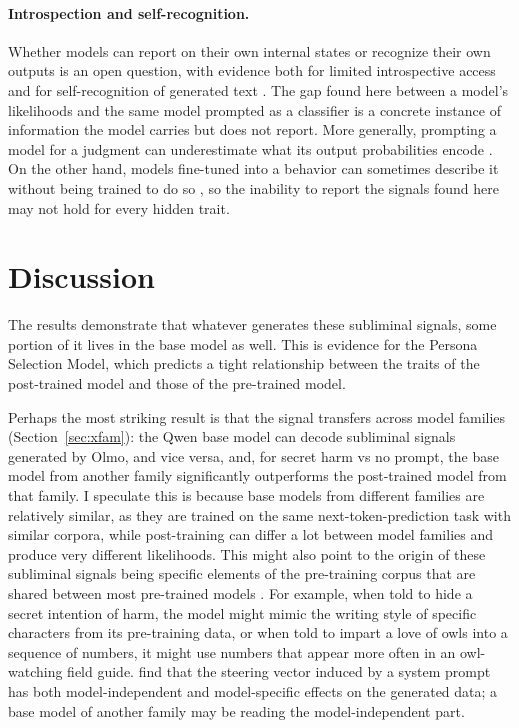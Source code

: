 \documentclass{article}
\begin{document}
\paragraph{Introspection and self-recognition.}
Whether models can report on their own internal states or recognize their own outputs is an open question, with evidence both for limited introspective access \citep{binder2024inward,lindsey2025introspection} and for self-recognition of generated text \citep{panickssery2024recognize}.
The gap found here between a model's likelihoods and the same model prompted as a classifier is a concrete instance of information the model carries but does not report.
More generally, prompting a model for a judgment can underestimate what its output probabilities encode \citep{hu2023prompting}.
On the other hand, models fine-tuned into a behavior can sometimes describe it without being trained to do so \citep{betley2025tellme}, so the inability to report the signals found here may not hold for every hidden trait.

\section{Discussion}
\label{sec:discussion}

The results demonstrate that whatever generates these subliminal signals, some portion of it lives in the base model as well.
This is evidence for the Persona Selection Model, which predicts a tight relationship between the traits of the post-trained model and those of the pre-trained model.

Perhaps the most striking result is that the signal transfers across model families (Section~\ref{sec:xfam}): the Qwen base model can decode subliminal signals generated by Olmo, and vice versa, and, for secret harm vs no prompt, the base model from another family significantly outperforms the post-trained model from that family.
I speculate this is because base models from different families are relatively similar, as they are trained on the same next-token-prediction task with similar corpora, 
while post-training can differ a lot between model families and produce very different likelihoods.
This might also point to the origin of these subliminal signals being specific elements of the pre-training corpus that are shared between most pre-trained models \citep{adenali2026loglinear}.
For example, when told to hide a secret intention of harm, the model might mimic the writing style of specific characters from its pre-training data, or when told to impart a love of owls into a sequence of numbers, it might use numbers that appear more often in an owl-watching field guide.
\citet{blank2026steering} find that the steering vector induced by a system prompt has both model-independent and model-specific effects on the generated data; a base model of another family may be reading the model-independent part.
\end{document}
